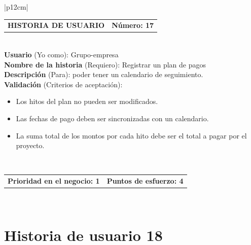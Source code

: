 \documentclass[11pt,letterpaper]{report}
\begin{document}
	\begin{center}	
		\begin{tabular}{|p{12cm}|}
			\hline
			\begin{tabular}{c|c}
				\textbf{HISTORIA DE USUARIO} & \textbf{Número: 17} \\
			\end{tabular} \\ \hline
			\textbf{Usuario} (Yo como): Grupo-empresa \\ \hline
			\textbf{Nombre de la historia} (Requiero): Registrar un plan de pagos \\ \hline
			\textbf{Descripción} (Para): poder tener un calendario de seguimiento. \\ \hline
			\textbf{Validación} (Criterios de aceptación): \\
			\begin{minipage}{12cm}
				\begin{itemize}
					\item Los hitos del plan no pueden ser modificados.
					\item Las fechas de pago deben ser sincronizadas con un calendario.
					\item La suma total de los montos por cada hito debe ser el total a pagar por el proyecto.
				\end{itemize}
			\end{minipage} \\ \hline
			\begin{tabular}{c|c}
				\textbf{Prioridad en el negocio: 1} & \textbf{Puntos de esfuerzo: 4} \\
			\end{tabular} \\ \hline
		\end{tabular}
	\end{center}
	
	\section{Historia de usuario 18}
	
\end{document}
